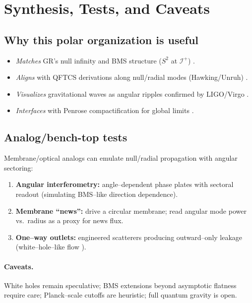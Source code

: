 \documentclass[12pt]{article}
\newcommand{\Iplus}{\mathcal{I}^+}
\begin{document}
\section{Synthesis, Tests, and Caveats}
\subsection{Why this polar organization is useful}
\begin{itemize}[leftmargin=1.2em]
\item \emph{Matches} GR’s null infinity and BMS structure ($S^2$ at $\Iplus$) \citep{Bondi1962,Sachs1962,BMS,NullInfinity}.
\item \emph{Aligns} with QFTCS derivations along null/radial modes (Hawking/Unruh) \citep{BirrellDavies1982,Hawking1975,Unruh1976,ParkerToms2009}.
\item \emph{Visualizes} gravitational waves as angular ripples confirmed by LIGO/Virgo \citep{Abbott2016GW}.
\item \emph{Interfaces} with Penrose compactification for global limits \citep{Penrose1964,NullInfinity}.
\end{itemize}

\subsection{Analog/bench-top tests}
Membrane/optical analogs can emulate null/radial propagation with angular sectoring:
\begin{enumerate}[leftmargin=1.2em]
\item \textbf{Angular interferometry:} angle–dependent phase plates with sectoral readout (simulating BMS–like direction dependence).
\item \textbf{Membrane ``news'':} drive a circular membrane; read angular mode power vs.\ radius as a proxy for news flux.
\item \textbf{One–way outlets:} engineered scatterers producing outward–only leakage (white–hole–like flow \citep{deLorenzo2016}).
\end{enumerate}

\paragraph{Caveats.}
White holes remain speculative; BMS extensions beyond asymptotic flatness require care; Planck–scale cutoffs are heuristic; full quantum gravity is open.
\end{document}
